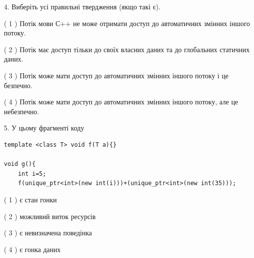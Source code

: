\documentclass[12pt, ukrainian]{article}
\begin{document}
\begin {large}
{%
4. Виберіть усі правильні твердження (якщо такі є).\par
\vspace{2mm}

( 1 ) Потік мови С++ не може отримати доступ до автоматичних змінних іншого потоку.%

( 2 ) Потік має доступ тільки до своїх власних даних та до глобальних статичних даних.%

( 3 ) Потік може мати доступ до автоматичних змінних іншого потоку і це безпечно.%

( 4 ) Потік може мати доступ до автоматичних змінних іншого потоку, але це небезпечно.%


5. У цьому фрагменті коду
\begin{verbatim}
template <class T> void f(T a){}

void g(){
    int i=5;
    f(unique_ptr<int>(new int(i)))+(unique_ptr<int>(new int(35)));
\end{verbatim}
( 1 ) є стан гонки%

( 2 ) можливий виток ресурсів%

( 3 ) є невизначена поведінка%

( 4 ) є гонка даних%
}
\end {large}
\end{document}
